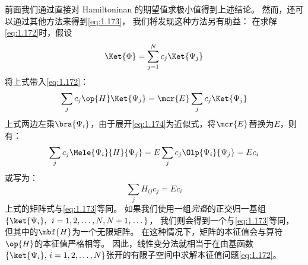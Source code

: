 前面我们通过直接对 Hamiltoninan 的期望值求极小值得到上述结论。
然而，还可以通过其他方法来得到\autoref{eq:1.173}，
我们将发现这种方法另有助益：
在求解\autoref{eq:1.172}时，假设
\begin{equation}
 \Ket{\Phi} = \sum_{j=1}^N c_j\Ket{\Psi_j}
 \label{eq:1.174}
\end{equation}
将上式带入\autoref{eq:1.172}：
\begin{equation}
 \sum_j c_j \op{H}\Ket{\Psi_j} = \mcr{E} \sum_j c_j \Ket{\Psi_j}
 \label{eq:1.175}
\end{equation}
上式两边左乘$\bra{\Psi_i}$，由于展开\autoref{eq:1.174}为近似式，将$\mcr{E}$替换为$E$，则有：
\[
\sum_j c_j \Mele{\Psi_i}{H}{\Psi_j} = E\sum_j c_j \Olp{\Psi_i}{\Psi_j} = Ec_i
\]
或写为：
\begin{equation}
 \sum_j H_{ij}c_j = E c_i
 \label{eq:1.176}
\end{equation}
上式的矩阵式与\autoref{eq:1.173}等同。
如果我们使用一组\emph{完备}的正交归一基组 $\left\{\ket{\Psi_i},
\right. \, i = 1, 2,\allowbreak \dots, N, N+1, \left.\dots \right\}$，
我们则会得到一个与\autoref{eq:1.173}等同，
但其中的$\mbf{H}$为一个无限矩阵。
在这种情况下，矩阵的本征值会与算符$\op{H}$的本征值严格相等。
因此，线性变分法就相当于在由基函数$\left\{\ket{\Psi_i},\,i=1,2,\dots,N\right\}$张开的有限子空间中求解本征值问题\autoref{eq:1.172}。
 
 
 
